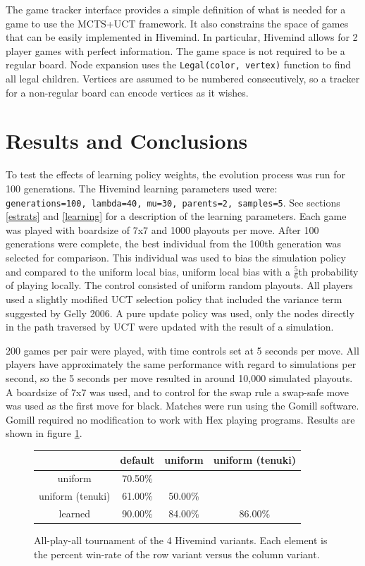 \documentclass[11pt]{report}
\begin{document}
The game tracker interface provides a simple definition of what is needed for a game to use the MCTS+UCT framework. It also constrains the space of games that can be easily implemented in Hivemind. In particular, Hivemind allows for 2 player games with perfect information. The game space is not required to be a regular board. Node expansion uses the \texttt{Legal(color, vertex)} function to find all legal children. Vertices are assumed to be numbered consecutively, so a tracker for a non-regular board can encode vertices as it wishes.

\section{Results and Conclusions}\label{results}
To test the effects of learning policy weights, the evolution process was run for 100 generations. The Hivemind learning parameters used were: \texttt{generations=100, lambda=40, mu=30, parents=2, samples=5}. See sections \ref{estrats} and \ref{learning} for a description of the learning parameters. Each game was played with boardsize of 7x7 and 1000 playouts per move. After 100 generations were complete, the best individual from the 100th generation was selected for comparison. This individual was used to bias the simulation policy and compared to the uniform local bias, uniform local bias with a $\frac{5}{6}$th probability of playing locally. The control consisted of uniform random playouts. All players used a slightly modified UCT selection policy that included the variance term suggested by Gelly 2006\cite{gelly2006exploration}. A pure update policy was used, only the nodes directly in the path traversed by UCT were updated with the result of a simulation.

200 games per pair were played, with time controls set at 5 seconds per move. All players have approximately the same performance with regard to simulations per second, so the 5 seconds per move resulted in around 10,000 simulated playouts. A boardsize of 7x7 was used, and to control for the swap rule a swap-safe move was used as the first move for black. Matches were run using the Gomill software\cite{gomill}. Gomill required no modification to work with Hex playing programs. Results are shown in figure \ref{fig:results}.

\begin{figure}
	\begin{center}
		\begin{tabular}{c | c c c}
		 & default & uniform & uniform (tenuki) \\
		\hline
		uniform & 70.50\% & & \\
		uniform (tenuki) & 61.00\% & 50.00\% & \\
		learned & 90.00\% & 84.00\% & 86.00\% \\
		\end{tabular}
	\caption{All-play-all tournament of the 4 Hivemind variants. Each element is the percent win-rate of the row variant versus the column variant.}
	\label{fig:results}
	\end{center}
\end{figure}
\end{document}
